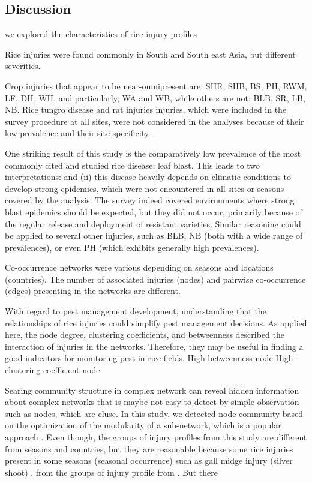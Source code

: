 \subsection{Discussion}

we explored the characteristics of rice injury profiles

Rice injuries were found commonly in South and South east Asia, but different severities.

Crop injuries that appear to be near-omnipresent are: SHR, SHB, BS, PH, RWM, LF, DH, WH, and particularly, WA and WB, while others are not: BLB, SR, LB, NB. Rice tungro disease and rat injuries injuries, which were included in the survey procedure at all sites, were not considered in the analyses because of their low prevalence and their site-specificity. 

One striking result of this study is the comparatively low prevalence of the most commonly cited and studied rice disease: leaf blast. This leads to two interpretations: and (ii) this disease heavily depends on climatic conditions to develop strong epidemics, which were not encountered in all sites or seasons covered by the analysis. The survey indeed covered environments where strong blast epidemics should be expected, but they did not occur, primarily because of the regular release and deployment of resistant varieties. Similar reasoning could be applied to several other injuries, such as BLB, NB (both with a wide range of prevalences), or even PH (which exhibits generally high prevalences).

Co-occurrence networks were various depending on seasons and locations (countries). The number of associated injuries (nodes) and pairwise co-occurrence (edges) presenting in the networks are different.

With regard to pest management development, understanding that the relationships of rice injuries could simplify pest management decisions. As applied here, the node degree, clustering coefficients, and betweenness described the interaction of injuries in the networks. Therefore, they may be useful in finding a good indicators for monitoring pest in rice fields. High-betweenness node High- clustering coefficient node 



Searing community structure in complex network can reveal hidden information about complex networks that is maybe not easy to detect by simple observation such as nodes, which are cluse. In this study, we detected node community based on the optimization of the modularity of a sub-network, which is a popular approach \cite{Liu_2014_Detecting}. Even though, the groups of injury profiles from this study are different from seasons and countries, but they are reasonable because some rice injuries present in some seasons (seasonal occurrence) such as gall midge injury (silver shoot) \cite{Krishnaiah_2004_Rice}. from the groups of injury profile from \cite{Savary_2000_Characterization}. But there 


